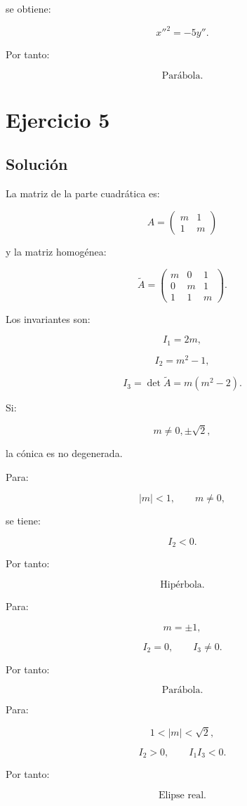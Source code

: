 \documentclass[11pt,a4paper]{article}
\begin{document}
se obtiene:

\[
\boxed{
x''^2=-5y''.
}
\]

Por tanto:

\[
\boxed{\text{Parábola}.}
\]

\section{Ejercicio 5}
\subsection{Solución}

La matriz de la parte cuadrática es:

\[
A=
\begin{pmatrix}
m&1\\
1&m
\end{pmatrix}
\]

y la matriz homogénea:

\[
\widetilde A=
\begin{pmatrix}
m&0&1\\
0&m&1\\
1&1&m
\end{pmatrix}.
\]

Los invariantes son:

\[
I_1=2m,
\]

\[
I_2=m^2-1,
\]

\[
I_3
=
\det\widetilde A
=
m(m^2-2).
\]

Si:

\[
m\neq0,\pm\sqrt2,
\]

la cónica es no degenerada.

Para:

\[
|m|<1,
\qquad
m\neq0,
\]

se tiene:

\[
I_2<0.
\]

Por tanto:

\[
\boxed{\text{Hipérbola}.}
\]

Para:

\[
m=\pm1,
\]

\[
I_2=0,
\qquad
I_3\neq0.
\]

Por tanto:

\[
\boxed{\text{Parábola}.}
\]

Para:

\[
1<|m|<\sqrt2,
\]

\[
I_2>0,
\qquad
I_1I_3<0.
\]

Por tanto:

\[
\boxed{\text{Elipse real}.}
\]
\end{document}

